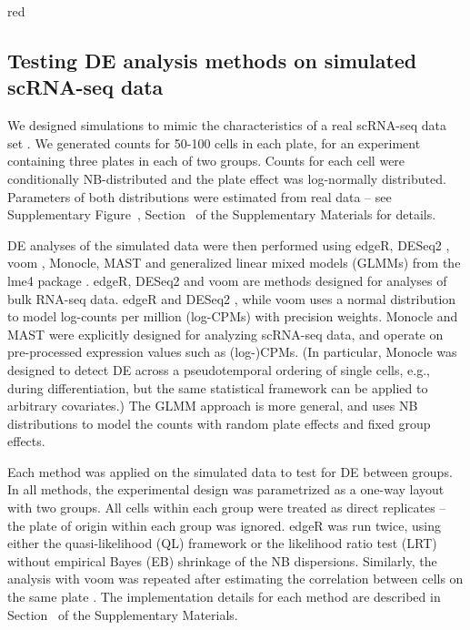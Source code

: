 \documentclass[oupdraft]{bio}
\begin{document}
\begin{color}{red}
\subsection{Testing DE analysis methods on simulated scRNA-seq data}
We designed simulations to mimic the characteristics of a real scRNA-seq data set \citep{kolod2015single}.
We generated counts for 50-100 cells in each plate, for an experiment containing three plates in each of two groups.
Counts for each cell were conditionally NB-distributed and the plate effect was log-normally distributed.
Parameters of both distributions were estimated from real data -- see Supplementary Figure~\suppparamsim{}, Section~\suppsimulation{} of the Supplementary Materials for details.

DE analyses of the simulated data were then performed using edgeR, DESeq2 \citep{love2014moderated}, voom \citep{law2014voom}, Monocle, MAST \citep{finak2015mast} and generalized linear mixed models (GLMMs) from the lme4 package \citep{bates2015fitting}.
edgeR, DESeq2 and voom are methods designed for analyses of bulk RNA-seq data.
edgeR and DESeq2 , while voom uses a normal distribution to model log-counts per million (log-CPMs) with precision weights.
Monocle and MAST were explicitly designed for analyzing scRNA-seq data, and operate on pre-processed expression values such as (log-)CPMs.
(In particular, Monocle was designed to detect DE across a pseudotemporal ordering of single cells, e.g., during differentiation, but the same statistical framework can be applied to arbitrary covariates.)
The GLMM approach is more general, and uses NB distributions to model the counts with random plate effects and fixed group effects.
\end{color}

Each method was applied on the simulated data to test for DE between groups. 
In all methods, the experimental design was parametrized as a one-way layout with two groups.
All cells within each group were treated as direct replicates -- the plate of origin within each group was ignored.
edgeR was run twice, using either the quasi-likelihood (QL) framework \citep{lund2012detecting} 
    or the likelihood ratio test (LRT) \citep{mccarthy2012differential} without empirical Bayes (EB) shrinkage of the NB dispersions.
Similarly, the analysis with voom was repeated after estimating the correlation between cells on the same plate \citep{smyth2005use}.
The implementation details for each method are described in Section~\suppimplementation{} of the Supplementary Materials.
\end{document}
